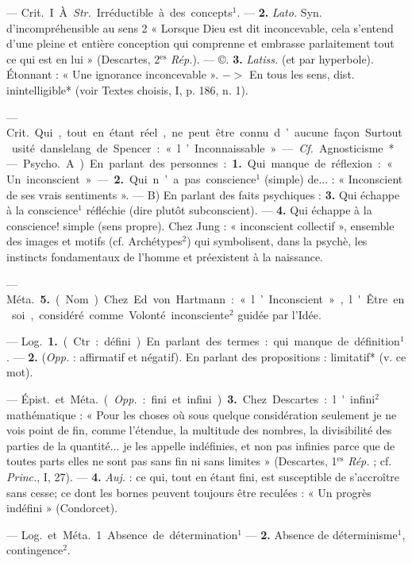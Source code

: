 \begin{itemize}[leftmargin=1cm, label=, itemsep=1pt]
 — \si{Crit.} I À. {\it Str.} Irréductible à des concepts$^1$. — {\bf 2.} {\it Lato.}
Syn. d'incompréhensible au sens 2
« Lorsque Dieu est dit inconcevable,
cela s'entend d’une pleine et entière
conception qui comprenne et embrasse parlaitement tout ce qui est
en lui » (Descartes, 2$^\text{es}$ {\it Rép.}). —
©. {\bf 3.} {\it Latiss.} (et par hyperbole).
Étonnant : « Une ignorance inconcevable ». $->$ En tous les sens, dist.
inintelligible* (voir Textes choisis,
I, p. 186, n. 1).

 — \si{Crit.} Qui, tout en
étant réel, ne peut être connu d’aucune façon. Surtout usité danslelang.
de Spencer : « l’Inconnaissable ». —
{\it {\it Cf.}} Agnosticisme*.

 — \si{Psycho.} A) En parlant
des personnes : {\bf 1.} Qui manque de
réflexion : « Un inconscient » —
 {\bf 2.} Qui n’a pas conscience$^1$ (simple)
de... : « Inconscient de ses vrais
sentiments ». — B) En parlant des
faits psychiques : {\bf 3.} Qui échappe à
la conscience$^1$ réfléchie (dire plutôt
subconscient). — {\bf 4.} Qui échappe à
la conscience! simple (sens propre).
Chez Jung : « inconscient collectif »,
ensemble des images et motifs (cf.
Archétypes$^2$) qui symbolisent, dans
la psychè, les instincts fondamentaux de l’homme et préexistent à la
naissance.

— \si{Méta.} {\bf 5.} (Nom). Chez Ed. von
Hartmann : « l’Inconscient », l'Être
en soi, considéré comme Volonté
inconsciente$^2$ guidée par l'Idée.

 — \si{Log.} {\bf 1.} (Ctr. : défini). En
parlant des termes : qui manque de
définition$^1$. — {\bf 2.} ({\it Opp.} : affirmatif
et négatif). En parlant des propositions : limitatif* (v. ce mot).

— \si{Épist.} et \si{Méta.} ({\it Opp.} : fini
et infini). {\bf 3.} Chez Descartes : l'infini$^2$
mathématique : « Pour les choses où
sous quelque considération seulement
je ne vois point de fin, comme l’étendue, la multitude des nombres, la
divisibilité des parties de la quantité... je les appelle indéfinies, et
non pas infinies parce que de toutes
parts elles ne sont pas sans fin ni
sans limites » (Descartes, 1$^\text{es}$ {\it Rép.} ;
cf. {\it Princ.}, I, 27). — {\bf 4.} {\it Auj.} : ce qui,
tout en étant fini, est susceptible
de s’accroître sans cesse; ce dont les
bornes peuvent toujours être reculées : « Un progrès indéfini » (Condorcet).

 — \si{Log.}
et \si{Méta.}
1. Absence de détermination$^1$ —
 {\bf 2.} Absence de déterminisme$^1$, contingence$^2$.


\end{itemize}
